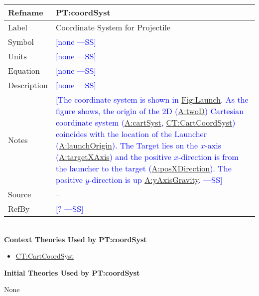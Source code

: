 \documentclass[12pt]{article}
\newcommand{\authornote}[3]{\textcolor{#1}{[#3 ---#2]}}
\newcommand{\authornote}[3]{}
\newcommand{\wss}[1]{\authornote{blue}{SS}{#1}}
\begin{document}
\medskip
\noindent
\begin{minipage}{\textwidth}
\begin{tabular}{>{\raggedright}p{}>{\raggedright\arraybackslash}p{}}
\toprule \textbf{Refname} & \textbf{PT:coordSyst}
\label{PT:coordSyst}
\\ \midrule
Label & Coordinate System for Projectile
        
\\ \midrule
Symbol & \wss{none}
         
\\ \midrule
Units & \wss{none}
        
\\ \midrule
Equation & \wss{none}

\\ \midrule
Description & \wss{none}

\\ \midrule Notes & \wss{The coordinate system is shown in
\hyperref[Figure:Launch]{Fig:Launch}.  As the figure shows, the origin of the 2D
(\hyperref[twoD]{A:twoD}) Cartesian coordinate system
(\hyperref[cartSyst]{A:cartSyst}, \hyperref[CT:CartCoordSyst]{CT:CartCoordSyst})
coincides with the location of the Launcher
(\hyperref[launchOrigin]{A:launchOrigin}). The Target lies on the $x$-axis
(\hyperref[targetXAxis]{A:targetXAxis}) and the positive $x$-direction is from the
launcher to the target (\hyperref[posXDirection]{A:posXDirection}).  The positive
$y$-direction is up \hyperref[yAxisGravity]{A:yAxisGravity}.}
        
\\ \midrule
Source & --
         
\\ \midrule
RefBy & \wss{?}
        
\\ \bottomrule
\end{tabular}
\end{minipage}
~\\

\noindent \textbf{Context Theories Used by PT:coordSyst}

\begin{itemize}
\item \hyperref[CT:CartCoordSyst]{CT:CartCoordSyst}
\end{itemize}

\noindent \textbf{Initial Theories Used by PT:coordSyst}

None
\end{document}

